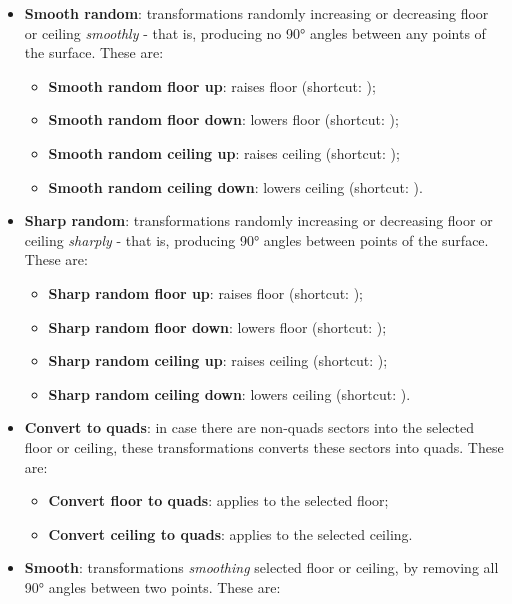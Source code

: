 \begin{itemize}
    \item \textbf{Smooth random}: transformations randomly increasing or decreasing floor or ceiling \emph{smoothly} - that is, producing no 90° angles between any points of the surface. These are:
    \begin{itemize}
        \item \textbf{Smooth random floor up}: raises floor (shortcut: );
        \item \textbf{Smooth random floor down}: lowers floor (shortcut: );
        \item \textbf{Smooth random ceiling up}: raises ceiling (shortcut: );
        \item \textbf{Smooth random ceiling down}: lowers ceiling (shortcut: ).
    \end{itemize}
    \item \textbf{Sharp random}: transformations randomly increasing or decreasing floor or ceiling \emph{sharply} - that is, producing 90° angles between points of the surface. These are:
    \begin{itemize}
        \item \textbf{Sharp random floor up}: raises floor (shortcut: );
        \item \textbf{Sharp random floor down}: lowers floor (shortcut: );
        \item \textbf{Sharp random ceiling up}: raises ceiling (shortcut: );
        \item \textbf{Sharp random ceiling down}: lowers ceiling (shortcut: ).
    \end{itemize}
    \item \textbf{Convert to quads}: in case there are non-quads sectors into the selected floor or ceiling, these transformations converts these sectors into quads. These are:
    \begin{itemize}
        \item \textbf{Convert floor to quads}: applies to the selected floor;
        \item \textbf{Convert ceiling to quads}: applies to the selected ceiling.
    \end{itemize}
    \item \textbf{Smooth}: transformations \emph{smoothing} selected floor or ceiling, by removing all 90° angles between two points. These are:

\end{itemize}
